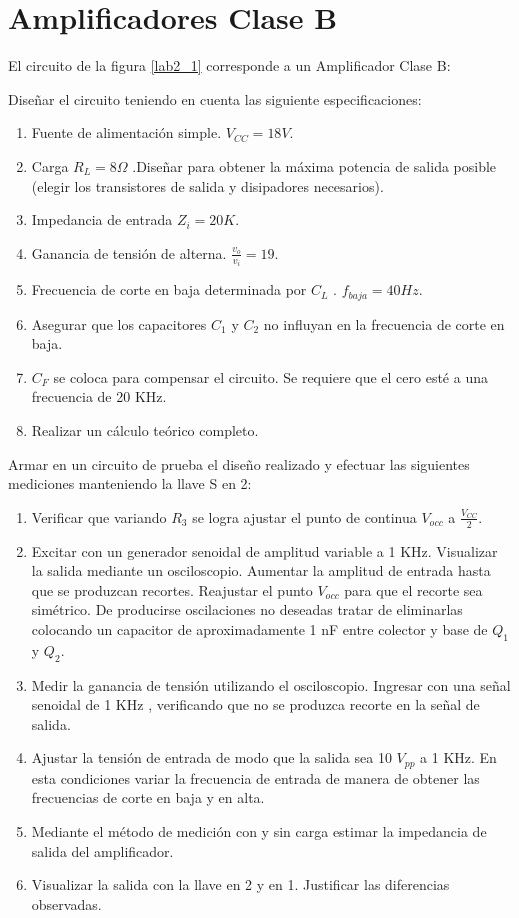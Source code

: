 \chapter{Amplificadores Clase B}

\hspace{10pt}
El  circuito de la figura \ref{lab2_1} corresponde a un Amplificador
Clase B:


Diseñar el circuito teniendo en cuenta las siguiente
especificaciones:

\begin{enumerate}
	\item Fuente de alimentación simple. $V_{CC} = 18 V$.
	\item Carga $R_L= 8 \Omega$ .Diseñar para obtener la máxima potencia de salida posible (elegir
	los transistores de salida y disipadores necesarios).
	\item Impedancia de entrada $Z_i= 20K$.
	\item Ganancia de tensión de alterna. $\frac{\displaystyle v_o}{\displaystyle v_i}=19$.
	\item Frecuencia de corte en baja determinada por $C_L$ .  $f_{baja}=40
	Hz$.
	\item Asegurar que los capacitores $C_1$ y $C_2$ no influyan en la
	frecuencia de corte en baja.
	\item $C_F$ se coloca para  compensar el circuito. Se requiere
	que el cero esté a una frecuencia de 20 KHz.
	\item Realizar un cálculo teórico completo.
\end{enumerate}

Armar en un circuito de prueba el diseño realizado y efectuar las
siguientes mediciones manteniendo la llave S en 2:

\begin{enumerate}
	\item Verificar que variando $R_3$ se logra ajustar el punto de continua $V_{occ}$ a $\frac {\displaystyle V_{CC}}{\displaystyle 2}$.
	\item Excitar con un generador senoidal de amplitud variable a 1
	KHz. Visualizar la salida mediante un osciloscopio. Aumentar la amplitud
	de entrada hasta que se produzcan recortes. Reajustar el punto
	$V_{occ}$ para que el recorte sea simétrico. De producirse
	oscilaciones no deseadas tratar de eliminarlas colocando un
	capacitor de aproximadamente 1 nF entre colector y base de $Q_1$ y
	$Q_2$.
	\item Medir la ganancia de tensión utilizando el osciloscopio. Ingresar con una señal senoidal de 1 KHz
	, verificando que no se produzca recorte en la señal de salida.
	\item Ajustar la tensión de entrada de modo que la salida sea 10 $V_{pp}$ a 1
	KHz. En esta condiciones variar la frecuencia de entrada de manera
	de obtener las frecuencias de corte en baja y en alta.
	\item Mediante el método de medición con y sin carga estimar la impedancia de
	salida del amplificador.
	\item Visualizar la salida con la llave en 2 y en 1. Justificar las diferencias observadas.
\end{enumerate}


